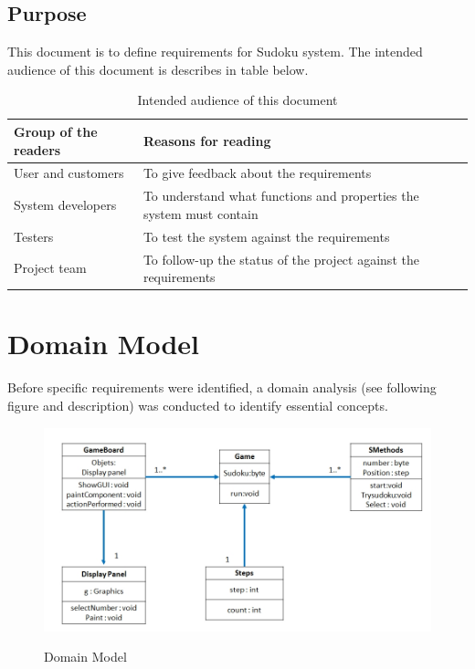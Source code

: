 \documentclass[12pt]{article}
\begin{document}
\subsection{Purpose}
This document is to define requirements for Sudoku system.
The intended audience of this document is describes in table below.
\begin{table}[h]
\begin{center}
\begin{tabular}{| l | l |}
\hline
Group of the readers & Reasons for reading \\
\hline\hline
User and customers & To give feedback about the requirements \\
\hline
System developers & To understand what functions and properties the system must contain \\
\hline
Testers & To test the system against the requirements \\
\hline
Project team & To follow-up the status of the project against the requirements \\
\hline
\end{tabular}
\end{center}
\caption{Intended audience of this document}
\end{table}

\section{Domain Model}
Before specific requirements were identified, a domain analysis (see following figure and description) was conducted to identify essential concepts. \\
\begin{figure}[h]
\begin{center}
\includegraphics[scale=0.43]{domain_model.jpg}
\label{fig:domain-model}
\end{center}
\caption{Domain Model}
\end{figure}
\end{document}
